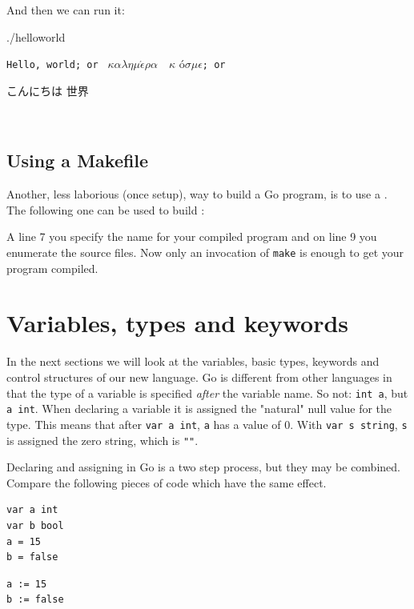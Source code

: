 And then we can run it:
\begin{display}
\pr ./helloworld
\end{display}
\vspace{-3.0ex}
\texttt{Hello, world; or }%
\begin{math}\kappa\alpha\lambda\eta\mu\acute{\epsilon}\rho\alpha\hspace{1em}\kappa\end{math}%
\'o\begin{math} \sigma\mu\epsilon\end{math}\texttt{; or }\begin{cjk}こんにちは 世界\end{cjk}
\ \newline
\ \newline

\subsection{Using a Makefile}
\label{sec:building a program}
Another, less laborious (once setup), way to build a Go program, is to use a
. The following one can be used to build
:

A line 7 you specify the name for your compiled program and on line 9
you enumerate the source files. Now only an invocation of \verb|make| is
enough to get your program compiled.

\section{Variables, types and keywords}
In the next sections we will look at the variables, basic types,
keywords and control structures of our new language. 
Go is different from other languages in that the type of a variable
is specified \emph{after} the variable name. So not: 
\lstinline{int a}, but \lstinline{a int}. When declaring a variable it
is assigned the "natural" null value for the type. This means that after
\lstinline{var a int}, \lstinline{a} has a value of 0. With
\lstinline{var s string}, \lstinline{s} is assigned the zero string,
which is \lstinline{""}. 

Declaring and assigning in Go is a two step process, but they may
be combined. Compare the following pieces of code which have
the same effect.

\begin{minipage}{.5\textwidth}
\begin{lstlisting}[linewidth=.5\textwidth,caption=Declaration with \texttt{=}]
var a int
var b bool
a = 15
b = false
\end{lstlisting}
\hfill
\end{minipage}
\begin{minipage}{.5\textwidth}
\begin{lstlisting}[linewidth=.5\textwidth,caption=Declaration with \texttt{:=}]
a := 15
b := false
\end{lstlisting}
\ \\
\ \\
\hfill
\end{minipage}

